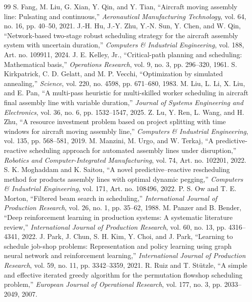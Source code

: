 \documentclass[journal,10pt]{IEEEtran}
\begin{document}
\begin{thebibliography}{99}
 S. Fang, M. Liu, G. Xian, Y. Qin, and Y. Tian, ``Aircraft moving assembly line: Pulsating and continuous,'' \emph{Aeronautical Manufacturing Technology}, vol. 64, no. 16, pp. 40--50, 2021.
 J.-H. Hu, J.-Y. Zhu, Y.-N. Sun, Y. Chen, and W. Qin, ``Network-based two-stage robust scheduling strategy for the aircraft assembly system with uncertain duration,'' \emph{Computers \& Industrial Engineering}, vol. 188, Art. no. 109911, 2024.
 J. E. Kelley, Jr., ``Critical-path planning and scheduling: Mathematical basis,'' \emph{Operations Research}, vol. 9, no. 3, pp. 296--320, 1961.
 S. Kirkpatrick, C. D. Gelatt, and M. P. Vecchi, ``Optimization by simulated annealing,'' \emph{Science}, vol. 220, no. 4598, pp. 671--680, 1983.
 M. Liu, L. Li, X. Liu, and E. Pan, ``A multi-pass heuristic for multi-skilled worker scheduling in aircraft final assembly line with variable duration,'' \emph{Journal of Systems Engineering and Electronics}, vol. 36, no. 6, pp. 1532--1547, 2025.
 Z. Lu, Y. Ren, L. Wang, and H. Zhu, ``A resource investment problem based on project splitting with time windows for aircraft moving assembly line,'' \emph{Computers \& Industrial Engineering}, vol. 135, pp. 568--581, 2019.
 M. Manzini, M. Urgo, and W. Terkaj, ``A predictive-reactive scheduling approach for automated assembly lines under disruption,'' \emph{Robotics and Computer-Integrated Manufacturing}, vol. 74, Art. no. 102201, 2022.
 S. K. Moghaddam and K. Saitou, ``A novel predictive--reactive rescheduling method for products assembly lines with optimal dynamic pegging,'' \emph{Computers \& Industrial Engineering}, vol. 171, Art. no. 108496, 2022.
 P. S. Ow and T. E. Morton, ``Filtered beam search in scheduling,'' \emph{International Journal of Production Research}, vol. 26, no. 1, pp. 35--62, 1988.
 M. Panzer and B. Bender, ``Deep reinforcement learning in production systems: A systematic literature review,'' \emph{International Journal of Production Research}, vol. 60, no. 13, pp. 4316--4341, 2022.
 J. Park, J. Chun, S. H. Kim, Y. Choi, and J. Park, ``Learning to schedule job-shop problems: Representation and policy learning using graph neural network and reinforcement learning,'' \emph{International Journal of Production Research}, vol. 59, no. 11, pp. 3342--3359, 2021.
 R. Ruiz and T. Stützle, ``A simple and effective iterated greedy algorithm for the permutation flowshop scheduling problem,'' \emph{European Journal of Operational Research}, vol. 177, no. 3, pp. 2033--2049, 2007.

\end{thebibliography}
\end{document}
